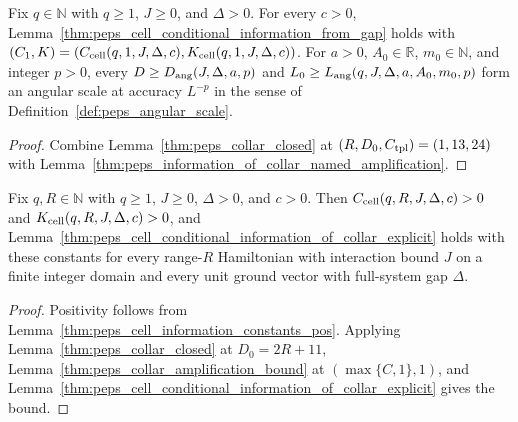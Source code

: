 \begin{lemma}
    \label{thm:peps_information_from_gap_closed}
    \leanok
    Fix $q\in\mathbb N$ with $q\ge1$, $J\ge0$, and $\Delta>0$. For every $c>0$, Lemma~\ref{thm:peps_cell_conditional_information_from_gap} holds with $(C_1,K)=(C_{\rm cell}(q,1,J,\Delta,c),K_{\rm cell}(q,1,J,\Delta,c))$. For $a>0$, $A_0\in\mathbb R$, $m_0\in\mathbb N$, and integer $p>0$, every $D\ge D_{\rm ang}(J,\Delta,a,p)$ and $L_0\ge L_{\rm ang}(q,J,\Delta,a,A_0,m_0,p)$ form an angular scale at accuracy $L^{-p}$ in the sense of Definition~\ref{def:peps_angular_scale}.
\end{lemma}
\begin{proof}\leanok
    Combine Lemma~\ref{thm:peps_collar_closed} at $(R,D_0,C_{\rm tpl})=(1,13,24)$ with Lemma~\ref{thm:peps_information_of_collar_named_amplification}.
\end{proof}

\begin{lemma}
    \label{thm:peps_cell_information_range_closed}
    \leanok
    Fix $q,R\in\mathbb N$ with $q\ge1$, $J\ge0$, $\Delta>0$, and $c>0$. Then $C_{\rm cell}(q,R,J,\Delta,c)>0$ and $K_{\rm cell}(q,R,J,\Delta,c)>0$, and Lemma~\ref{thm:peps_cell_conditional_information_of_collar_explicit} holds with these constants for every range-$R$ Hamiltonian with interaction bound $J$ on a finite integer domain and every unit ground vector with full-system gap $\Delta$.
\end{lemma}
\begin{proof}\leanok
    Positivity follows from Lemma~\ref{thm:peps_cell_information_constants_pos}. Applying Lemma~\ref{thm:peps_collar_closed} at $D_0=2R+11$, Lemma~\ref{thm:peps_collar_amplification_bound} at $(\max\{C,1\},1)$, and Lemma~\ref{thm:peps_cell_conditional_information_of_collar_explicit} gives the bound.
\end{proof}

